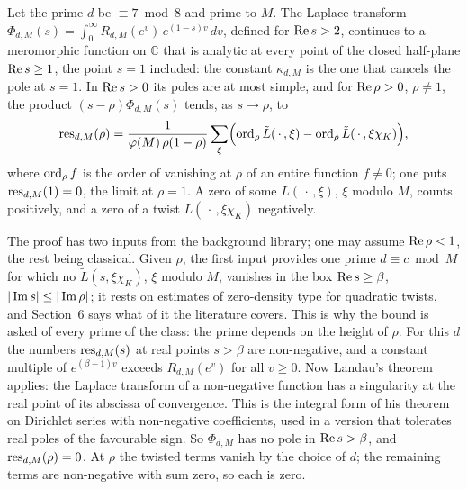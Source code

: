  Let the prime $d$ be $\equiv7\bmod8$ and prime to $M$. The Laplace transform
$\Phi_{d,M}(s)=\int_0^\infty R_{d,M}(e^{v})\,e^{(1-s)v}\,dv$, defined for $\operatorname{Re} s>2$, continues to a meromorphic function
on $\mathbb{C}$ that is analytic at every point of the closed half-plane $\operatorname{Re} s\ge1$, the point $s=1$ included:
the constant $\kappa_{d,M}$ is the one that cancels the pole at $s=1$. In $\operatorname{Re} s>0$ its poles are at most simple,
and for $\operatorname{Re}\rho>0$, $\rho\ne1$, the product $(s-\rho)\Phi_{d,M}(s)$ tends, as $s\to\rho$, to
\[
\operatorname{res}_{d,M}(\rho)=\frac{1}{\varphi(M)\,\rho(1-\rho)}\sum_{\xi}\Bigl(\operatorname{ord}_{\rho}\tilde L(\,\cdot\,,\xi)-\operatorname{ord}_{\rho}\tilde L(\,\cdot\,,\xi\chi_K)\Bigr),
\]
where $\operatorname{ord}_{\rho}f$ is the order of vanishing at $\rho$ of an entire function $f\ne0$; one puts
$\operatorname{res}_{d,M}(1)=0$, the limit at $\rho=1$. A zero of some $L(\,\cdot\,,\xi)$, $\xi$ modulo $M$, counts positively, and a zero of a twist $L(\,\cdot\,,\xi\chi_K)$
negatively.


The proof has two inputs from the background library; one may assume $\operatorname{Re}\rho<1$, the rest being classical.
Given $\rho$, the first input provides one prime $d\equiv c\bmod M$ for which no
$\tilde L(s,\xi\chi_K)$, $\xi$ modulo $M$, vanishes in the box $\operatorname{Re} s\ge\beta$, $|\operatorname{Im} s|\le|\operatorname{Im}\rho|$; it rests
on estimates of zero-density type for quadratic twists, and Section~6 says what of it the literature covers. This is why
the bound is asked of every prime of the class: the prime depends on the height of $\rho$. For this $d$ the numbers
$\operatorname{res}_{d,M}(s)$ at real points $s>\beta$ are non-negative, and a constant multiple of $e^{(\beta-1)v}$ exceeds
$R_{d,M}(e^{v})$ for all $v\ge 0$. Now Landau's theorem applies: the Laplace transform of a non-negative function has a singularity
at the real point of its abscissa of convergence. This is the integral form of his theorem on Dirichlet series with
non-negative coefficients, used in a version that tolerates real poles of the favourable sign. So $\Phi_{d,M}$ has
no pole in $\operatorname{Re} s>\beta$, and $\operatorname{res}_{d,M}(\rho)=0$. At $\rho$ the twisted terms vanish by the choice of $d$; the
remaining terms are non-negative with sum zero, so each is zero.

